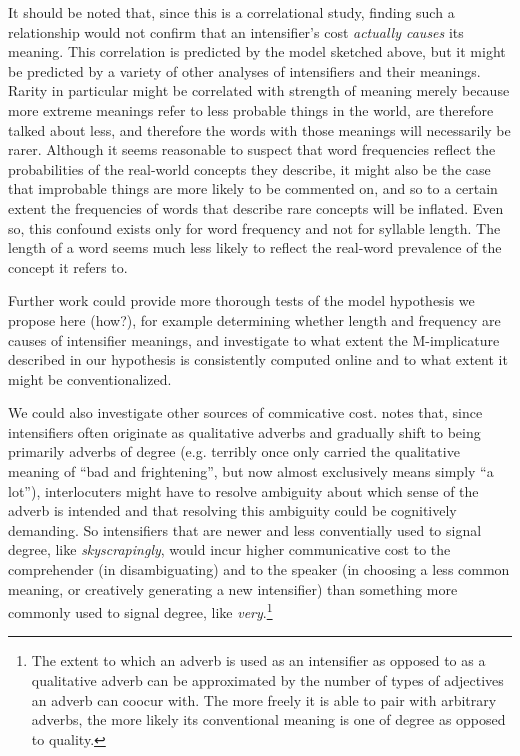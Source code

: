 \documentclass[10pt,letterpaper]{article}
\newcommand{\w}[1]{\emph{#1}}
\newcommand{\todo}[1]{{\color{red}#1}}
\begin{document}

It should be noted that, since this is a correlational study, finding such a relationship would not confirm that an intensifier's cost \emph{actually causes} its meaning. This correlation is predicted by the model sketched above, but it might be predicted by a variety of other analyses of intensifiers and their meanings. Rarity in particular might be correlated with strength of meaning merely because more extreme meanings refer to less probable things in the world, are therefore talked about less, and therefore the words with those meanings will necessarily be rarer. Although it seems reasonable to suspect that word frequencies reflect the probabilities of the real-world concepts they describe, it might also be the case that improbable things are more likely to be commented on, and so to a certain extent the frequencies of words that describe rare concepts will be inflated. Even so, this confound exists only for word frequency and not for syllable length.
The length of a word seems much less likely to reflect the real-word prevalence of the concept it refers to.

Further work could provide more thorough tests of the model hypothesis we propose here \todo{(how?)}, for example determining whether length and frequency are causes of intensifier meanings, and investigate to what extent the M-implicature described in our hypothesis is consistently computed online and to what extent it might be conventionalized.

We could also investigate other sources of commicative cost.  %
notes that, since intensifiers often originate as qualitative adverbs and gradually shift to being primarily adverbs of degree (e.g. terribly once only carried the qualitative meaning of ``bad and frightening'', but now almost exclusively means simply ``a lot''), interlocuters might have to resolve ambiguity about which sense of the adverb is intended and that resolving this ambiguity could be cognitively demanding. So intensifiers that are newer and less conventially used to signal degree, like \w{skyscrapingly}, would incur higher communicative cost to the comprehender (in disambiguating) and to the speaker (in choosing a less common meaning, or creatively generating a new intensifier) than something more commonly used to signal degree, like \w{very}.\footnote{The extent to which an adverb is used as an intensifier as opposed to as a qualitative adverb can be approximated by the number of types of adjectives an adverb can coocur with. The more freely it is able to pair with arbitrary adverbs, the more likely its conventional meaning is one of degree as opposed to quality.}
\end{document}
